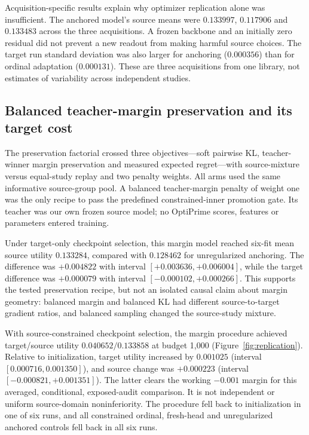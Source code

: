

Acquisition-specific results explain why optimizer replication alone was insufficient. The anchored model's source means were $0.133997$, $0.117906$ and $0.133483$ across the three acquisitions. A frozen backbone and an initially zero residual did not prevent a new readout from making harmful source choices. The target run standard deviation was also larger for anchoring ($0.000356$) than for ordinal adaptation ($0.000131$). These are three acquisitions from one library, not estimates of variability across independent studies.

\subsection{Balanced teacher-margin preservation and its target cost}
\label{sec:supretention}
The preservation factorial crossed three objectives---soft pairwise KL, teacher-winner margin preservation and measured expected regret---with source-mixture versus equal-study replay and two penalty weights. All arms used the same informative source-group pool. A balanced teacher-margin penalty of weight one was the only recipe to pass the predefined constrained-inner promotion gate. Its teacher was our own frozen source model; no OptiPrime scores, features or parameters entered training.

Under target-only checkpoint selection, this margin model reached six-fit mean source utility $0.133284$, compared with $0.128462$ for unregularized anchoring. The difference was $+0.004822$ with interval $[+0.003636,+0.006004]$, while the target difference was $+0.000079$ with interval $[-0.000102,+0.000266]$. This supports the tested preservation recipe, but not an isolated causal claim about margin geometry: balanced margin and balanced KL had different source-to-target gradient ratios, and balanced sampling changed the source-study mixture.

With source-constrained checkpoint selection, the margin procedure achieved target/source utility $0.040652/0.133858$ at budget 1,000 (Figure~\ref{fig:replication}). Relative to initialization, target utility increased by $0.001025$ (interval $[0.000716,0.001350]$), and source change was $+0.000223$ (interval $[-0.000821,+0.001351]$). The latter clears the working $-0.001$ margin for this averaged, conditional, exposed-audit comparison. It is not independent or uniform source-domain noninferiority. The procedure fell back to initialization in one of six runs, and all constrained ordinal, fresh-head and unregularized anchored controls fell back in all six runs.

